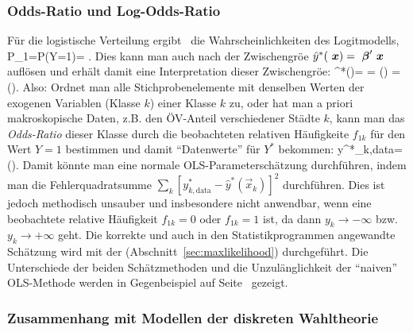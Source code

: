 \subsubsection*{Odds-Ratio und Log-Odds-Ratio}

F\"ur die logistische Verteilung ergibt~ die Wahrscheinlichkeiten
des Logitmodells,
\be
\label{Plogistic}
P_1=P(Y=1)= .
\ee
Dies kann man auch nach der Zwischengr\"o\3e $\hat{y}^*({\mbox{ \boldmath{$x$}}})={\mbox{ \boldmath{$\beta$}}}'
{\mbox{ \boldmath{$x$}}}$ aufl\"osen und erh\"alt damit eine Interpretation dieser
Zwischengr\"o\3e: 
\be
\label{oddsRatio}
^*()=\vec{\beta}\tr {} = \ln\left(\right)
= \ln\left(\right).
\ee
Also:
Ordnet man alle Stichprobenelemente mit denselben Werten der exogenen
Variablen (Klasse $k$) einer Klasse $k$ zu, oder hat man a priori
makroskopische Daten, z.B. den \"OV-Anteil verschiedener St\"adte $k$, 
kann man das \emph{Odds-Ratio}
dieser Klasse durch die beobachteten relativen H\"aufigkeite  $f_{1k}$ f\"ur den
Wert $Y=1$ bestimmen und damit ``Datenwerte'' f\"ur $Y^*$ bekommen: 
\be
\label{oddsRatioEmp}
y^*_{k,\textrm{data}}= \ln\left(\right).
\ee
Damit k\"onnte man eine normale OLS-Parametersch\"atzung
durchf\"uhren, indem man die Fehlerquadratsumme
 $\sum_k[y^*_{k,\textrm{data}}-\hat{y}^*(\vec{x}_k)]^2$ 
durchf\"uhren. Dies ist jedoch methodisch unsauber und insbesondere
nicht anwendbar, wenn eine beobachtete relative H\"aufigkeit
$f_{1k}=0$ oder $f_{1k}=1$ ist, da dann $y_k \to -\infty$ bzw. $y_k
\to +\infty$ geht. Die korrekte und auch in den Statistikprogrammen
angewandte Sch\"atzung wird mit der
(Abschnitt~\ref{sec:maxlikelihood}) durchgef\"uhrt.  Die Unterschiede
der beiden Sch\"atz\-me\-tho\-den und die Unzul\"anglichkeit der ``naiven''
OLS-Methode werden in Gegenbeispiel auf Seite~\pageref{sec:logOLS} gezeigt.


\subsubsection*{Zusammenhang mit Modellen der diskreten Wahltheorie}

